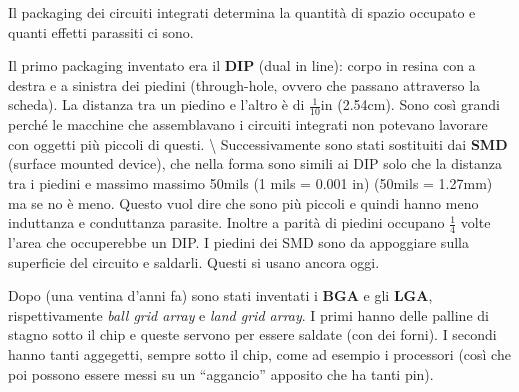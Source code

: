 \documentclass[
]{book}
\begin{document}
Il packaging dei circuiti integrati determina la quantità di spazio
occupato e quanti effetti parassiti ci sono.

Il primo packaging inventato era il \textbf{DIP} (dual in line): corpo
in resina con a destra e a sinistra dei piedini (through-hole, ovvero
che passano attraverso la scheda). La distanza tra un piedino e l'altro
è di \(\frac{1}{10}\)in (2.54cm). Sono così grandi perché le macchine
che assemblavano i circuiti integrati non potevano lavorare con oggetti
più piccoli di questi. \textbackslash{} Successivamente sono stati
sostituiti dai \textbf{SMD} (surface mounted device), che nella forma
sono simili ai DIP solo che la distanza tra i piedini e massimo massimo
50mils (1 mils = 0.001 in) (50mils = 1.27mm) ma se no è meno. Questo
vuol dire che sono più piccoli e quindi hanno meno induttanza e
conduttanza parasite. Inoltre a parità di piedini occupano
\(\frac{1}{4}\) volte l'area che occuperebbe un DIP. I piedini dei SMD
sono da appoggiare sulla superficie del circuito e saldarli. Questi si
usano ancora oggi.

Dopo (una ventina d'anni fa) sono stati inventati i \textbf{BGA} e gli
\textbf{LGA}, rispettivamente \emph{ball grid array} e \emph{land grid
array}. I primi hanno delle palline di stagno sotto il chip e queste
servono per essere saldate (con dei forni). I secondi hanno tanti
aggegetti, sempre sotto il chip, come ad esempio i processori (così che
poi possono essere messi su un ``aggancio'' apposito che ha tanti pin).
\end{document}
